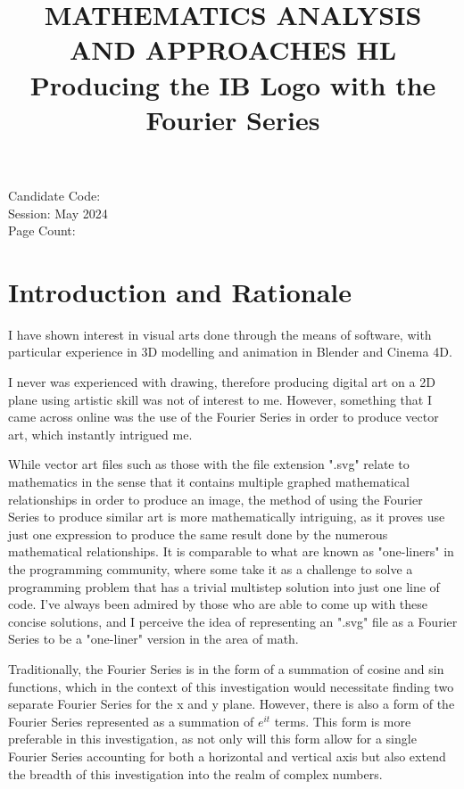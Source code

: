 \documentclass[letterpaper, 12pt]{article}
\title{MATHEMATICS ANALYSIS AND APPROACHES HL
\\
Producing the IB Logo with the Fourier Series}
\author{}
\date{}
\begin{document}
\nocite{*}

\maketitle
\begin{center}
    Candidate Code:
    \\
    Session: May 2024
    \\
    Page Count:
\end{center}
\newpage

\tableofcontents
\newpage


\setcounter{page}{1}

\section{Introduction and Rationale}

I have shown interest in visual arts done through the means of software,
with particular experience in 3D modelling and animation in Blender
and Cinema 4D.

I never was experienced with drawing, therefore producing digital art
on a 2D plane using artistic skill was not of interest to me. However,
something that I came across online was the use of the Fourier Series
in order to produce vector art, which instantly intrigued me.

While vector art files such as those with the file extension ".svg" relate
to mathematics in the sense that it contains multiple graphed mathematical
relationships in order to produce an image, the method of using the Fourier
Series to produce similar art is more mathematically intriguing, as it
proves use just one expression to produce the same result done by the numerous mathematical
relationships. It is comparable to what are known as "one-liners"
in the programming community, where some take it as a challenge to
solve a programming problem that has a trivial multistep solution
into just one line of code. I've always been admired by those
who are able to come up with these concise solutions, and I
perceive the idea of representing an ".svg" file as a Fourier Series
to be a "one-liner" version in the area of math.

Traditionally, the Fourier Series is in the form of a summation
of cosine and sin functions, which in the context of this investigation
would necessitate finding two separate Fourier Series for the
x and y plane. However, there is also a form of the Fourier Series
represented as a summation of \(e^{it}\) terms. This
form is more preferable in this investigation, as not only
will this form allow for a single Fourier Series accounting
for both a horizontal and vertical axis but also extend
the breadth of this investigation into the realm of
complex numbers.
\end{document}
